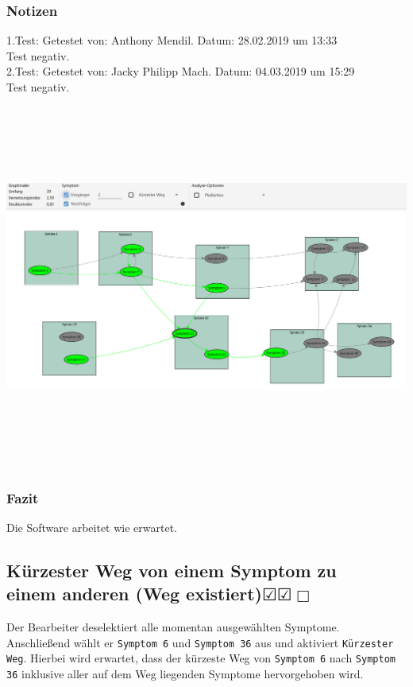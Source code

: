 \documentclass[enabledeprecatedfontcommands]{scrartcl}
\newcommand{\subsectiont}[2]{\subsection[#1]{#1{\normalsize\normalfont #2}}}
\newcommand{\leer}{$\Box$}
\newcommand{\ok}{$\CheckedBox$}
\begin{document}
\subsubsection{Notizen}
1.Test: Getestet von: Anthony Mendil. Datum: 28.02.2019 um 13:33 \\
Test negativ. \\
2.Test: Getestet von: Jacky Philipp Mach. Datum: 04.03.2019 um 15:29 \\
Test negativ.
\begin{center}
\includegraphics[height=12cm, angle=90]{analysevorgaengerUndNachfolger.PNG}
\end{center}
\subsubsection{Fazit}
Die Software arbeitet wie erwartet.

\subsectiont{Kürzester Weg von einem Symptom zu \\einem anderen (Weg existiert)}{\dotfill\ok\ok\leer}
Der Bearbeiter deselektiert alle momentan ausgewählten Symptome. Anschließend wählt er \texttt{Symptom 6} und \texttt{Symptom 36} aus und aktiviert \texttt{Kürzester Weg}. Hierbei wird erwartet, dass der kürzeste Weg von \texttt{Symptom 6} nach \texttt{Symptom 36} inklusive aller auf dem Weg liegenden Symptome hervorgehoben wird. 
\end{document}
